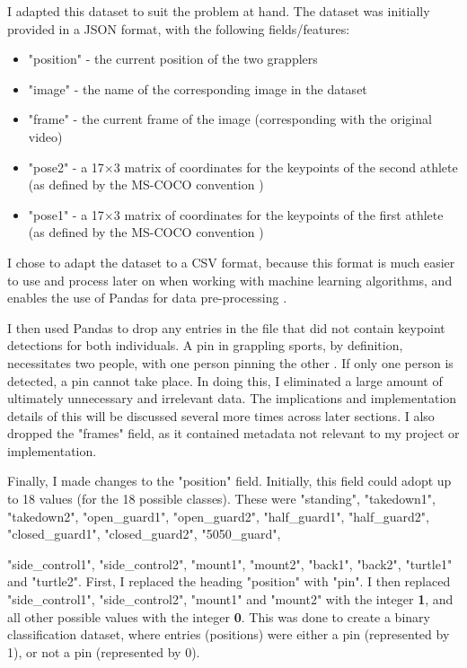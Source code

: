 \documentclass[a4paper, oneside, 11pt]{article}
\begin{document}
\noindent
I adapted this dataset to suit the problem at hand. The dataset was initially provided in a JSON format, with the following fields/features:

\begin{itemize}
    \item "position" - the current position of the two grapplers
    \item "image" - the name of the corresponding image in the dataset
    \item "frame" - the current frame of the image (corresponding with the original video)
    \item "pose2" - a 17$\times$3 matrix of coordinates for the keypoints of the second athlete (as defined by the MS-COCO convention \cite{MSCOCO})
    \item "pose1" - a 17$\times$3 matrix of coordinates for the keypoints of the first athlete (as defined by the MS-COCO convention \cite{MSCOCO})
\end{itemize}

\noindent
I chose to adapt the dataset to a CSV format, because this format is much easier to use and process later on when working with machine learning algorithms, and enables the use of Pandas for data pre-processing \cite{pandas}.

\bigskip
\noindent
I then used Pandas to drop any entries in the file that did not contain keypoint detections for both individuals. A pin in grappling sports, by definition, necessitates two people, with one person pinning the other \cite{cejudo2012wrestling}. If only one person is detected, a pin cannot take place. In doing this, I eliminated a large amount of ultimately unnecessary and irrelevant data. The implications and implementation details of this will be discussed several more times across later sections. I also dropped the "frames" field, as it contained metadata not relevant to my project or implementation.

\bigskip
\noindent
Finally, I made changes to the "position" field. Initially, this field could adopt up to 18 values (for the 18 possible classes). These were "standing", "takedown1", "takedown2", "open\_guard1", "open\_guard2", "half\_guard1", "half\_guard2", "closed\_guard1", "closed\_guard2", "5050\_guard", 

\noindent
"side\_control1", "side\_control2", "mount1", "mount2", "back1", "back2", "turtle1" and "turtle2". First, I replaced the heading "position" with "pin". I then replaced "side\_control1", "side\_control2", "mount1" and "mount2" with the integer \textbf{1}, and all other possible values with the integer \textbf{0}. This was done to create a binary classification dataset, where entries (positions) were either a pin (represented by 1), or not a pin (represented by 0).
\end{document}
